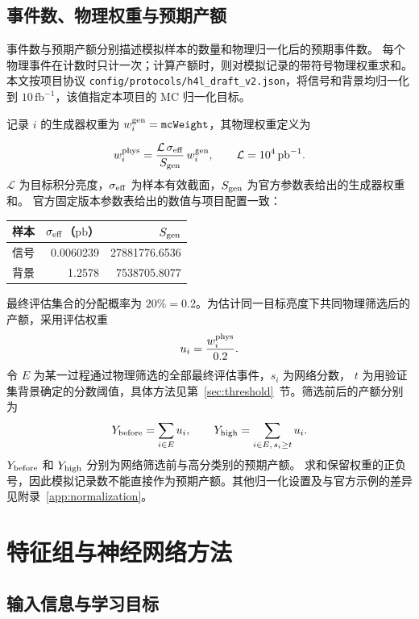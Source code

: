 \documentclass[11pt,a4paper,fontset=fandol,scheme=plain]{ctexart}
\begin{document}
\subsection{事件数、物理权重与预期产额}

\label{sec:weights}

事件数与预期产额分别描述模拟样本的数量和物理归一化后的预期事件数。
每个物理事件在计数时只计一次；计算产额时，则对模拟记录的带符号物理权重求和。
本文按项目协议 \nolinkurl{config/protocols/h4l_draft_v2.json}，将信号和背景均归一化到
$10\,\mathrm{fb}^{-1}$，该值指定本项目的 MC 归一化目标。

记录 $i$ 的生成器权重为 $w_i^{\rm gen}=\texttt{mcWeight}$，其物理权重定义为

\[
 w_i^{\rm phys}=\frac{\mathcal L\,\sigma_{\rm eff}}{S_{\rm gen}}\,w_i^{\rm gen},
 \qquad \mathcal L=10^4\,\mathrm{pb}^{-1}.
\]
$\mathcal L$ 为目标积分亮度，$\sigma_{\rm eff}$ 为样本有效截面，$S_{\rm gen}$ 为官方参数表给出的生成器权重和。
官方固定版本参数表\cite{SampleInfo}给出的数值与项目配置一致：
\begin{center}
\small
\begin{tabular}{lrr}
\toprule
样本 & $\sigma_{\rm eff}$（$\mathrm{pb}$） & $S_{\rm gen}$ \\
\midrule
信号 & 0.0060239 & 27881776.6536 \\
背景 & 1.2578 & 7538705.8077 \\
\bottomrule
\end{tabular}
\end{center}

最终评估集合的分配概率为 $20\%=0.2$。为估计同一目标亮度下共同物理筛选后的产额，采用评估权重
\[
 u_i=\frac{w_i^{\rm phys}}{0.2}.
\]
令 $E$ 为某一过程通过物理筛选的全部最终评估事件，$s_i$ 为网络分数，
$t$ 为用验证集背景确定的分数阈值，具体方法见第~\ref{sec:threshold}~节。筛选前后的产额分别为
\[
 Y_{\rm before}=\sum_{i\in E}u_i,\qquad
 Y_{\rm high}=\sum_{i\in E,\,s_i\geq t}u_i.
\]
$Y_{\rm before}$ 和 $Y_{\rm high}$ 分别为网络筛选前与高分类别的预期产额。
求和保留权重的正负号，因此模拟记录数不能直接作为预期产额。其他归一化设置及与官方示例的差异见附录~\ref{app:normalization}。


\FloatBarrier

\section{特征组与神经网络方法}

\subsection{输入信息与学习目标}
\end{document}
